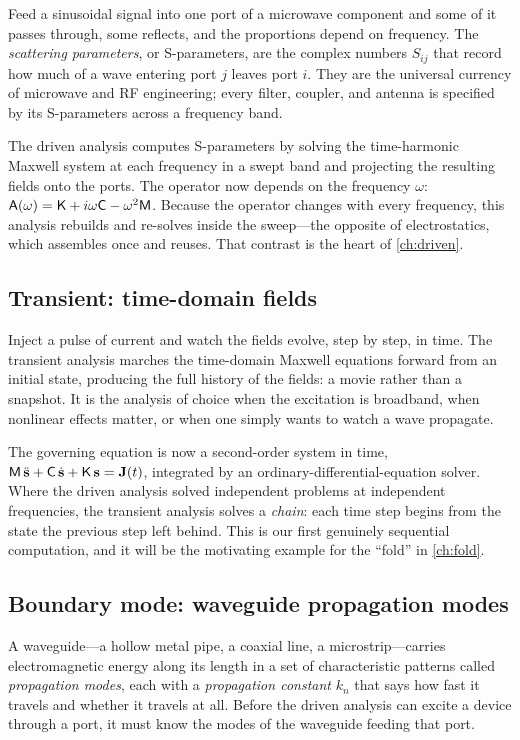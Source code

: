 Feed a sinusoidal signal into one port of a microwave component and some of it
passes through, some reflects, and the proportions depend on frequency. The
\emph{scattering parameters}, or S-parameters, are the complex numbers $S_{ij}$
that record how much of a wave entering port $j$ leaves port $i$. They are the
universal currency of microwave and RF engineering; every filter, coupler, and
antenna is specified by its S-parameters across a frequency band.

The driven analysis computes S-parameters by solving the time-harmonic Maxwell
system at each frequency in a swept band and projecting the resulting fields onto
the ports. The operator now depends on the frequency $\omega$:
$\mathsf{A}(\omega)=\mathsf{K}+i\omega\mathsf{C}-\omega^2\mathsf{M}$. Because the operator
changes with every frequency, this analysis rebuilds and re-solves inside the
sweep---the opposite of electrostatics, which assembles once and reuses. That
contrast is the heart of \cref{ch:driven}.

\subsection{Transient: time-domain fields}

Inject a pulse of current and watch the fields evolve, step by step, in time.
The transient analysis marches the time-domain Maxwell equations forward from an
initial state, producing the full history of the fields: a movie rather than a
snapshot. It is the analysis of choice when the excitation is broadband, when
nonlinear effects matter, or when one simply wants to watch a wave propagate.

The governing equation is now a second-order system in time,
$\mathsf{M}\,\ddot{\mathbf{s}}+\mathsf{C}\,\dot{\mathbf{s}}+\mathsf{K}\,\mathbf{s}=\mathbf{J}(t)$, integrated by an
ordinary-differential-equation solver. Where the driven analysis solved
independent problems at independent frequencies, the transient analysis solves a
\emph{chain}: each time step begins from the state the previous step left
behind. This is our first genuinely sequential computation, and it will be the
motivating example for the ``fold'' in \cref{ch:fold}.

\subsection{Boundary mode: waveguide propagation modes}

A waveguide---a hollow metal pipe, a coaxial line, a microstrip---carries
electromagnetic energy along its length in a set of characteristic patterns
called \emph{propagation modes}, each with a \emph{propagation constant} $k_n$
that says how fast it travels and whether it travels at all. Before the driven
analysis can excite a device through a port, it must know the modes of the
waveguide feeding that port.

